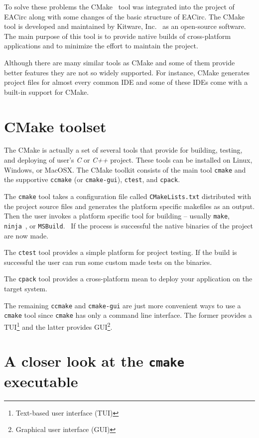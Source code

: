 \documentclass[12pt,oneside]{fithesis2}
\begin{document}
To solve these problems the CMake~\cite{cmake} tool was integrated into the project of EACirc along with some changes of the basic structure of EACirc. The CMake tool is developed and maintained by Kitware, Inc.~\cite{kitware} as an open-source software. The main purpose of this tool is to provide native builds of cross-platform applications and to minimize the effort to maintain the project.

Although there are many similar tools as CMake and some of them provide better features they are not so widely supported. For instance, CMake generates project files for almost every common IDE and some of these IDEs come with a built-in support for CMake.

\section{CMake toolset}

The CMake is actually a set of several tools that provide for building, testing, and deploying of user's \emph{C} or \emph{C++} project. These tools can be installed on Linux, Windows, or MacOSX. The CMake toolkit consists of the main tool \texttt{cmake} and the supportive \texttt{ccmake} (or \texttt{cmake-gui}), \texttt{ctest}, and \texttt{cpack}.~\cite{cmake_docs}

The \texttt{cmake} tool takes a configuration file called \texttt{CMakeLists.txt} distributed with the project source files and generates the platform specific makefiles as an output. Then the user invokes a platform specific tool for building -- usually \texttt{make}, \texttt{ninja}~\cite{ninja}, or \texttt{MSBuild}.~\cite{msbuild} If the process is successful the native binaries of the project are now made.

The \texttt{ctest} tool provides a simple platform for project testing. If the build is successful the user can run some custom made tests on the binaries.

The \texttt{cpack} tool provides a cross-platform mean to deploy your application on the target system.

The remaining \texttt{ccmake} and \texttt{cmake-gui} are just more convenient ways to use a \texttt{cmake} tool since \texttt{cmake} has only a command line interface. The former provides a TUI\footnote{Text-based user interface (TUI)} and the latter provides GUI\footnote{Graphical user interface (GUI)}.

\section{A closer look at the \texttt{cmake} executable}
\end{document}
